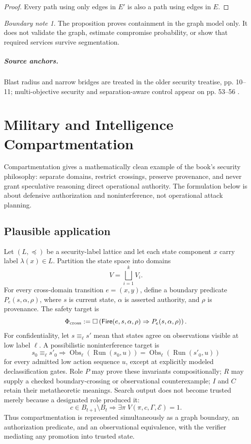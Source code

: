 \documentclass[11pt,oneside]{book}
\theoremstyle{definition}
\theoremstyle{remark}
\newtheorem{boundary}[theorem]{Boundary note}
\newcommand{\Fire}{\mathsf{Fire}}
\begin{document}
\begin{proof}
Every path using only edges in \(E'\) is also a path using edges in \(E\).
\end{proof}

\begin{boundary}
The proposition proves containment in the graph model only. It does not validate the graph, estimate
compromise probability, or show that required services survive segmentation.
\end{boundary}

\paragraph{Source anchors.} Blast radius and narrow bridges are treated in the older security
treatise, pp. 10--11; multi-objective security and separation-aware control appear on pp. 53--56
\cite{TennesonSecurity}.

\chapter{Military and Intelligence Compartmentation}
\label{ch:compartmentation}

Compartmentation gives a mathematically clean example of the book's security philosophy: separate
domains, restrict crossings, preserve provenance, and never grant speculative reasoning direct
operational authority. The formulation below is about defensive authorization and noninterference,
not operational attack planning.

\section{Plausible application}
Let \((L,\preceq)\) be a security-label lattice and let each state component \(x\) carry label
\(\lambda(x)\in L\). Partition the state space into domains
\[
V=\bigsqcup_{i=1}^{k}V_i.
\]
For every cross-domain transition \(e=(x,y)\), define a boundary predicate
\(P_e(s,\alpha,\rho)\), where \(s\) is current state, \(\alpha\) is asserted authority, and \(\rho\)
is provenance. The safety target is
\[
\Phi_{\rm cross}:=
\Box\left(
\Fire(e,s,\alpha,\rho)
\Rightarrow P_e(s,\alpha,\rho)
\right).
\]
For confidentiality, let \(s\equiv_\ell s'\) mean that states agree on observations visible at low
label \(\ell\). A possibilistic noninterference target is
\[
s_0\equiv_\ell s'_0
\Longrightarrow
\operatorname{Obs}_\ell(\operatorname{Run}(s_0,u))
=\operatorname{Obs}_\ell(\operatorname{Run}(s'_0,u))
\]
for every admitted low action sequence \(u\), except at explicitly modeled declassification gates.
Role \(P\) may prove these invariants compositionally; \(R\) may supply a checked boundary-crossing
or observational counterexample; \(I\) and \(C\) retain their metatheoretic meanings. Search output
does not become trusted merely because a designated role produced it:
\[
c\in B_{t+1}\setminus B_t
\Longrightarrow
\exists\pi\;V(\pi,c,\Gamma,\mathcal E)=1.
\]
Thus compartmentation is represented simultaneously as a graph boundary, an authorization
predicate, and an observational equivalence, with the verifier mediating any promotion into trusted
state.
\end{document}
